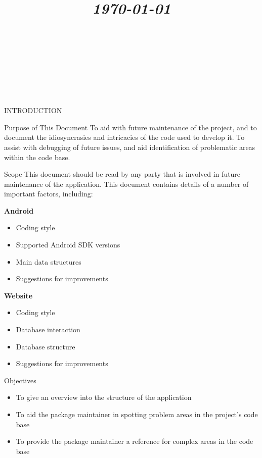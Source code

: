 \documentclass{article}
\title{
	\vspace{1.2in}
	\textmd{\textbf{\doctitle}} \\
	\vspace{0.1in}\large{\textit{\today}} \\
	\vspace{0.4in}
	{\bf{\qanumber}} \\ \vspace{0.4in}
	\version \\
	\status \\
	\vspace{0.4in}
}
\author{\authors}
\date{}
\begin{document}
	\maketitle
	\newpage
	\tableofcontents
	\newpage

	\begin{section}{INTRODUCTION}
		\begin{subsection}{Purpose of This Document}
			To aid with future maintenance of the project, and to document the idiosyncrasies and intricacies of the code used to develop it. To assist with debugging of future issues, and aid identification of problematic areas within the code base.
		\end{subsection}
	
		\begin{subsection}{Scope}
			This document should be read by any party that is involved in future maintenance of the application. This document contains details of a number of important factors, including:
			
			{\bf Android}
			\begin{itemize}
				\item{Coding style}
				\item{Supported Android SDK versions}
				\item{Main data structures}
				\item{Suggestions for improvements}
			\end{itemize}
			
			{\bf Website}
			\begin{itemize}
				\item{Coding style}
				\item{Database interaction}
				\item{Database structure}
				\item{Suggestions for improvements}
			\end{itemize}
		\end{subsection}
		
		\begin{subsection}{Objectives}
			\begin{itemize}
				\item{To give an overview into the structure of the application}
				\item{To aid the package maintainer in spotting problem areas in the project's code base}
				\item{To provide the package maintainer a reference for complex areas in the code base}
			\end{itemize}
		\end{subsection}
	\end{section}
	
\end{document}
